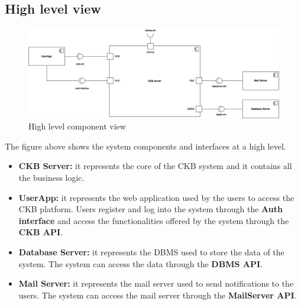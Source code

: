 \subsection{High level view}
\begin{figure}[H]
    \centering
    \includegraphics[width=\textwidth]{images/component_view/Component_view.png}
    \caption{High level component view}
\end{figure}
The figure above shows the system components and interfaces at a high level.
\begin{itemize}
    \item \textbf{CKB Server: } it represents the core of the CKB system and it contains all the business logic.
    \item \textbf{UserApp: } it represents the web application used by the users to access the CKB platform. Users register and log into the system through the 
    \textbf{Auth interface} and access the functionalities offered by the system through the \textbf{CKB API}.
    \item \textbf{Database Server: } it represents the DBMS used to store the data of the system. The system can access the data through the \textbf{DBMS API}.
    \item \textbf{Mail Server: } it represents the mail server used to send notifications to the users. The system can access the mail server through the \textbf{MailServer API}.
\end{itemize}

